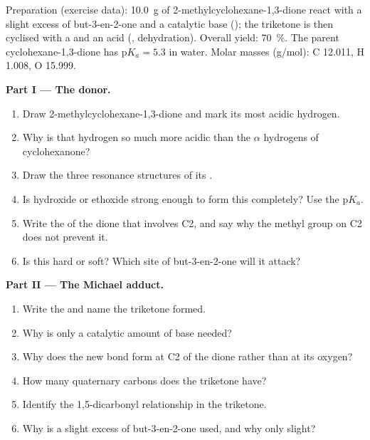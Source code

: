 \begin{problem}
\label{pb:b2:conjugate-additions:1}
Preparation (exercise data): \qty{10.0}{g} of 2-methylcyclohexane-1,3-dione react with a slight excess
of but-3-en-2-one and a catalytic base (); the triketone is then cyclised with a
 and an acid (, dehydration). Overall yield: 70~\%. The parent cyclohexane-1,3-dione
has $\mathrm pK_a = 5.3$ in water. Molar masses (\unit{g/mol}): C 12.011, H 1.008, O 15.999.

\medskip
\noindent\textbf{Part I --- The donor.}
\begin{enumerate}
  \item Draw 2-methylcyclohexane-1,3-dione and mark its most acidic hydrogen.
  \item Why is that hydrogen so much more acidic than the $\alpha$ hydrogens of cyclohexanone?
  \item Draw the three resonance structures of its .
  \item Is hydroxide or ethoxide strong enough to form this  completely? Use the $\mathrm pK_a$.
  \item Write the  of the dione that involves C2, and say why the methyl group on C2 does not
        prevent it.
  \item Is this  hard or soft? Which site of but-3-en-2-one will it attack?
\end{enumerate}

\medskip
\noindent\textbf{Part II --- The Michael adduct.}
\begin{enumerate}[resume]
  \item Write the  and name the triketone formed.
  \item Why is only a catalytic amount of base needed?
  \item Why does the new bond form at C2 of the dione rather than at its oxygen?
  \item How many quaternary carbons does the triketone have?
  \item Identify the 1,5-dicarbonyl relationship in the triketone.
  \item Why is a slight excess of but-3-en-2-one used, and why only slight?
\end{enumerate}


\end{problem}
